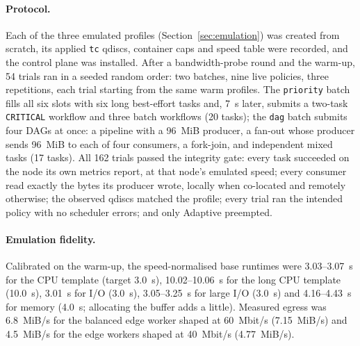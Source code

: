 \documentclass[12pt,a4paper]{report}
\begin{document}
\paragraph{Protocol.} Each of the three emulated profiles
(Section~\ref{sec:emulation}) was created from scratch, its applied
\texttt{tc} qdiscs, container caps and speed table were recorded, and the
control plane was installed. After a bandwidth-probe round and the
warm-up, 54 trials ran in a seeded random order: two batches, nine live
policies, three repetitions, each trial starting from the same warm
profiles. The \texttt{priority} batch fills all six slots with six long
best-effort tasks and, 7~s later, submits a two-task \texttt{CRITICAL}
workflow and three batch workflows (20 tasks); the \texttt{dag} batch
submits four DAGs at once: a pipeline with a 96~MiB producer, a fan-out
whose producer sends 96~MiB to each of four consumers, a fork-join, and
independent mixed tasks (17 tasks). All 162 trials passed the integrity
gate: every task succeeded on the node its own metrics report, at that
node's emulated speed; every consumer read exactly the bytes its producer
wrote, locally when co-located and remotely otherwise; the observed qdiscs
matched the profile; every trial ran the intended policy with no
scheduler errors; and only Adaptive preempted.

\paragraph{Emulation fidelity.} Calibrated on the warm-up, the
speed-normalised base runtimes were 3.03--3.07~s for the CPU template
(target 3.0~s), 10.02--10.06~s for the long CPU template (10.0~s),
3.01~s for I/O (3.0~s), 3.05--3.25~s for large I/O (3.0~s) and
4.16--4.43~s for memory (4.0~s; allocating the buffer adds a little).
Measured egress was 6.8~MiB/s for the balanced edge worker shaped at
60~Mbit/s (7.15~MiB/s) and 4.5~MiB/s for the edge workers shaped at
40~Mbit/s (4.77~MiB/s).
\end{document}
